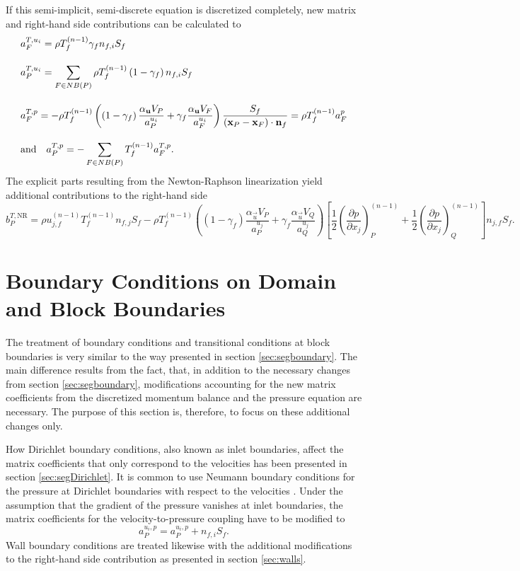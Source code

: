 If this semi-implicit, semi-discrete equation is discretized completely, new matrix and right-hand side contributions can be calculated to
\begin{align*}
  \allowdisplaybreaks
  &a_F^{T,u_i} = \rho T_f^{(n-1)} \gamma_f n_{f,i} S_f \\[1.0em] 
  &a_P^{T,u_i} = \sum_{F \in NB(P)} \rho T_f^{(n-1)} \left(1-\gamma_f\right) n_{f,i} S_f \\[1.0em]
  &a_F^{T,p} = -\rho T_f^{(n-1)} \left(\left(1 - \gamma_f\right) \frac{\alpha_\vec{u} V_P}{a_P^{u_i}} + \gamma_f \frac{\alpha_\vec{u} V_F}{a_F^{u_i}}\right) \frac{S_f}{\left(\vec{x}_P - \vec{x}_F\right) \cdot \vec{n}_f} = \rho T_f^{(n-1)} a_F^{p} \\[1.0em] 
  &\text{and} \quad
  a_P^{T,p} = - \sum_{F \in NB(P)} T_f^{(n-1)} a_F^{T,p}.
\end{align*}
The explicit parts resulting from the Newton-Raphson linearization yield additional contributions to the right-hand side
\begin{displaymath}
  b_P^{T,\text{NR}} 
  = 
  \rho u_{j,f}^{(n-1)} T_f^{(n-1)} n_{f,j} S_f 
  - \rho T_f^{(n-1)} \left(\left(1 - \gamma_f\right) \frac{\alpha_\vec{u} V_P}{a_P^{u_j}} + \gamma_f \frac{\alpha_\vec{u} V_Q}{a_Q^{u_j}}\right)
    \left[ 
    \frac{1}{2} \left( \frac{\partial p}{\partial x_j} \right)_P^{(n-1)} 
    + \frac{1}{2} \left(\frac{\partial p}{\partial x_j}\right)_Q^{(n-1)} 
    \right] n_{j,f} S_f.
\end{displaymath}

\section{Boundary Conditions on Domain and Block Boundaries}

The treatment of boundary conditions and transitional conditions at block boundaries is very similar to the way presented in section \ref{sec:segboundary}. The main difference results from the fact, that, in addition to the necessary changes from section \ref{sec:segboundary}, modifications accounting for the new matrix coefficients from the discretized momentum balance and the pressure equation are necessary. The purpose of this section is, therefore, to focus on these additional changes only.

How Dirichlet boundary conditions, also known as inlet boundaries, affect the matrix coefficients that only correspond to the velocities has been presented in section \ref{sec:segDirichlet}. It is common to use Neumann boundary conditions for the pressure at Dirichlet boundaries with respect to the velocities \cite{darwish09}. Under the assumption that the gradient of the pressure vanishes at inlet boundaries, the matrix coefficients for the velocity-to-pressure coupling have to be modified to 
\begin{displaymath}
  a_P^{u_i,p} = a_P^{u_i,p} + n_{f,i} S_f.
\end{displaymath}
Wall boundary conditions are treated likewise with the additional modifications to the right-hand side contribution as presented in section \ref{sec:walls}.

